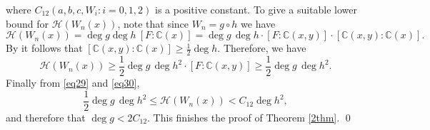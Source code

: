 \documentclass[12pt]{amsart}
\newcommand{\C}{\mbox{$\mathbb C$}}     %
\begin{document}
where $C_{12}(a,b,c,W_i: i=0,1,2)$ is a positive constant. To give a suitable lower bound for $\mathcal{H}(W_n(x))$, note that since $W_n=g\circ h$ we have 
\begin{equation*}
    \mathcal{H}(W_n(x))=\deg g\deg h~ [F: \C(x)]=\deg g \, \deg h \cdot [F : \mathbb{C}(x,y)] \cdot [\mathbb{C}(x,y) : \mathbb{C}(x)].
\end{equation*}
By \cite[Lemma 3]{fuchs2019decomposable} it follows that $[\mathbb{C}(x,y) : \mathbb{C}(x)] \ge \frac{1}{2} \deg h$. Therefore, we have
\begin{equation}\label{eq30}
    \mathcal{H}(W_n(x)) \ge \frac{1}{2} \deg g \, \deg h^2 \cdot [F : \mathbb{C}(x,y)] \ge \frac{1}{2} \deg g \, \deg h^2.
\end{equation}
Finally from \eqref{eq29} and \eqref{eq30},
\[
\frac{1}{2} \deg g \, \deg h^2 \le \mathcal{H}(W_n(x)) < C_{12} \deg h^2,
\]
and therefore that $\deg g < 2C_{12}$. This finishes the proof of Theorem \ref{2thm}. \qed
\end{document}

